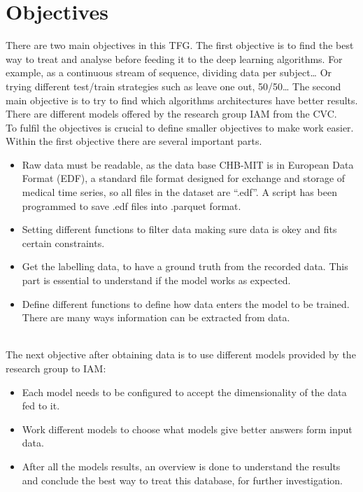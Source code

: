 ﻿\documentclass[10pt,a4paper,twocolumn,twoside]{article}
\begin{document}


\section{Objectives}
\label{sec-objectives}
There are two main objectives in this TFG. The first objective is to find the best way to treat and analyse before feeding it to the deep learning algorithms. For example, as a continuous stream of sequence, dividing data per subject…  Or trying different test/train strategies such as leave one out, 50/50… The second main objective is to try to find which algorithms architectures have better results. There are different models offered by the research group IAM from the CVC.
\\
To fulfil the objectives is crucial to define smaller objectives to make work easier. Within the first objective there are several important parts. 
\\
\begin{itemize}
  \item Raw data must be readable, as the data base CHB-MIT\cite{goldberger2000physiobank} is in European Data Format (EDF), a standard file format designed for exchange and storage of medical time series, so all files in the dataset are “.edf”. A script has been programmed to save .edf files into .parquet format.
  \item Setting different functions to filter data making sure data is okey and fits certain constraints. 
  \item Get the labelling data, to have a ground truth from the recorded data. This part is essential to understand if the model works as expected.
  \item Define different functions to define how data enters the model to be trained. There are many ways information can be extracted from data. 
\end{itemize}
\leavevmode\\
The next objective after obtaining data is to use different models provided by the research group to IAM:
\\
\begin{itemize}
  \item Each model needs to be configured to accept the dimensionality of the data fed to it.
  \item Work different models to choose what models give better answers form input data.
  \item After all the models results, an overview is done to understand the results and conclude the best way to treat this database, for further investigation.
\end{itemize}
\leavevmode\\
\end{document}
